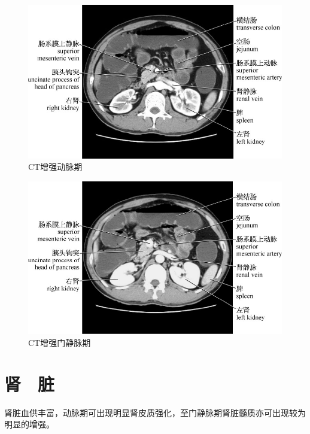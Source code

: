 \begin{figure}[!htbp]
 \centering
 \includegraphics{./images/Image00150.jpg}
 \captionsetup{justification=centering}
 \caption{CT增强动脉期}
  \end{figure} 
 \FloatBarrier

\begin{figure}[!htbp]
 \centering
 \includegraphics{./images/Image00151.jpg}
 \captionsetup{justification=centering}
 \caption{CT增强门静脉期}
  \end{figure} 
 \FloatBarrier

\section{肾　脏}

肾脏血供丰富，动脉期可出现明显肾皮质强化，至门静脉期肾脏髓质亦可出现较为明显的增强。

